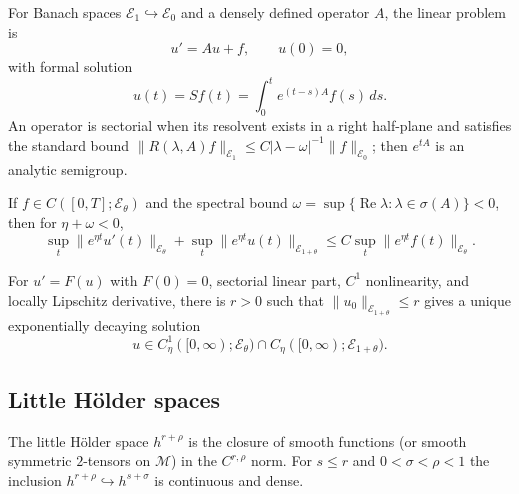 For Banach spaces $\mathcal E_1\hookrightarrow\mathcal E_0$ and a densely
defined operator $A$, the linear problem is
\begin{equation*}
 u'=Au+f,\qquad u(0)=0,
 \tag{35.10}
\end{equation*}
with formal solution
\begin{equation*}
 u(t)=Sf(t)=\int_0^t e^{(t-s)A}f(s)\,ds.
 \tag{35.11}
\end{equation*}
An operator is sectorial when its resolvent exists in a right half-plane and
satisfies the standard bound $\|R(\lambda,A)f\|_{\mathcal E_1}\le
C|\lambda-\omega|^{-1}\|f\|_{\mathcal E_0}$; then $e^{tA}$ is an analytic
semigroup.

\begin{proposition}
\label{prop:chow-iv-linear-maximal-regularity}
If $f\in C([0,T];\mathcal E_\theta)$ and the spectral bound
$\omega=\sup\{\operatorname{Re}\lambda:\lambda\in\sigma(A)\}<0$, then for
$\eta+\omega<0$,
\begin{equation*}
 \sup_t\|e^{\eta t}u'(t)\|_{\mathcal E_\theta}
 +\sup_t\|e^{\eta t}u(t)\|_{\mathcal E_{1+\theta}}
 \le C\sup_t\|e^{\eta t}f(t)\|_{\mathcal E_\theta}.
 \tag{35.12}
\end{equation*}
\end{proposition}

\begin{proposition}
\label{prop:chow-iv-nonlinear-maximal-regularity}
For $u'=F(u)$ with $F(0)=0$, sectorial linear part, $C^1$ nonlinearity,
and locally Lipschitz derivative, there is $r>0$ such that
$\|u_0\|_{\mathcal E_{1+\theta}}\le r$ gives a unique exponentially decaying
solution
\[
 u\in C^1_\eta([0,\infty);\mathcal E_\theta)\cap
 C_\eta([0,\infty);\mathcal E_{1+\theta}).
\]
\end{proposition}

\subsection{Little H\"older spaces}

\begin{definition}
\label{def:chow-iv-little-holder-spaces}
The little H\"older space $h^{r+\rho}$ is the closure of smooth functions (or
smooth symmetric $2$-tensors on $\mathcal M$) in the $C^{r,\rho}$ norm.  For
$s\le r$ and $0<\sigma<\rho<1$ the inclusion
$h^{r+\rho}\hookrightarrow h^{s+\sigma}$ is continuous and dense.
\end{definition}

